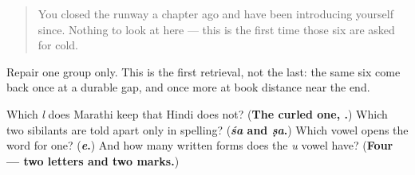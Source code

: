 \label{lesson:MR-R09-runway-tail-r2}



\begin{quote}
You closed the runway a chapter ago and have been introducing yourself since. Nothing to look at here — this is the first time those six are asked for cold.
\end{quote}

\begin{tcolorbox}[breakable,colback=teal!4,colframe=teal!35!black,title={Before you move on}]
Repair one group only. This is the first retrieval, not the last: the same six come back once at a durable gap, and once more at book distance near the end.

Which \emph{l} does Marathi keep that Hindi does not? (\textbf{The curled one, .}) Which two sibilants are told apart only in spelling? (\textbf{\emph{śa} and \emph{ṣa}.}) Which vowel opens the word for one? (\textbf{\emph{e}.}) And how many written forms does the \emph{u} vowel have? (\textbf{Four — two letters and two marks.})
\end{tcolorbox}
